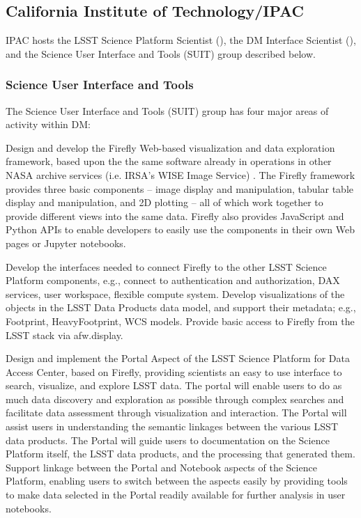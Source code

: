\subsection {California Institute of Technology/IPAC\label{sect:ipac}}
IPAC hosts the \gls{LSST} \gls{Science Platform} Scientist (), the \gls{DM} Interface Scientist (), and the Science User Interface and Tools (\gls{SUIT}) group described below.

\subsubsection{ Science User Interface and Tools}

The Science User Interface and Tools (\gls{SUIT}) group has four major areas of activity within \gls{DM}:

Design and develop the \gls{Firefly} Web-based visualization and data exploration framework, based upon the the same software already in operations in other \gls{NASA} archive services (i.e. \gls{IRSA}’s \gls{WISE} Image Service) . The \gls{Firefly} framework provides three basic components –  image display and manipulation, tabular table display and manipulation, and \gls{2D} plotting – all of which work together to provide different views into the same data. \gls{Firefly} also provides JavaScript and Python APIs to enable developers to easily use the components in their own Web pages or Jupyter notebooks.

Develop the interfaces needed to connect Firefly to the other LSST Science Platform components, e.g., connect to authentication and authorization, DAX services, user workspace, flexible compute system.  Develop visualizations of the objects in the LSST Data Products data model, and support their metadata; e.g., Footprint, HeavyFootprint, WCS models.  Provide basic access to Firefly from the LSST stack via afw.display.

Design and implement the Portal Aspect of the \gls{LSST} \gls{Science Platform} for \gls{Data Access Center}, based on \gls{Firefly}, providing scientists an easy to use interface to search, visualize, and explore \gls{LSST} data. The portal will enable users to do as much data discovery and exploration as possible through complex searches and facilitate data assessment through visualization and interaction.  The Portal will assist users in understanding the semantic linkages between the various \gls{LSST} data products. The Portal will guide users to documentation on the \gls{Science Platform} itself, the \gls{LSST} data products, and the processing that generated them.  Support linkage between the Portal and Notebook aspects of the \gls{Science Platform}, enabling users to switch between the aspects easily by providing tools to make data selected in the Portal readily available for further analysis in user notebooks.


